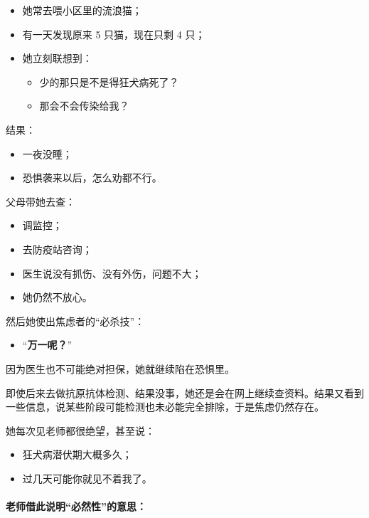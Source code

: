 \documentclass[
  chinese,
  9pt,
  a4paper,
]{ctexart}
\providecommand{\tightlist}{%
  \setlength{\itemsep}{0pt}\setlength{\parskip}{0pt}}
\begin{document}
\begin{itemize}
\item
  她常去喂小区里的流浪猫；
\item
  有一天发现原来 5 只猫，现在只剩 4 只；
\item
  她立刻联想到：

  \begin{itemize}
  \tightlist
  \item
    少的那只是不是得狂犬病死了？
  \item
    那会不会传染给我？
  \end{itemize}
\end{itemize}

结果：

\begin{itemize}
\tightlist
\item
  一夜没睡；
\item
  恐惧袭来以后，怎么劝都不行。
\end{itemize}

父母带她去查：

\begin{itemize}
\tightlist
\item
  调监控；
\item
  去防疫站咨询；
\item
  医生说没有抓伤、没有外伤，问题不大；
\item
  她仍然不放心。
\end{itemize}

然后她使出焦虑者的``必杀技''：

\begin{itemize}
\tightlist
\item
  ``\textbf{万一呢？}''
\end{itemize}

因为医生也不可能绝对担保，她就继续陷在恐惧里。

即使后来去做抗原抗体检测、结果没事，她还是会在网上继续查资料。结果又看到一些信息，说某些阶段可能检测也未必能完全排除，于是焦虑仍然存在。

她每次见老师都很绝望，甚至说：

\begin{itemize}
\tightlist
\item
  狂犬病潜伏期大概多久；
\item
  过几天可能你就见不着我了。
\end{itemize}

\paragraph{老师借此说明``必然性''的意思：}\label{ux8001ux5e08ux501fux6b64ux8bf4ux660eux5fc5ux7136ux6027ux7684ux610fux601d}
\end{document}
